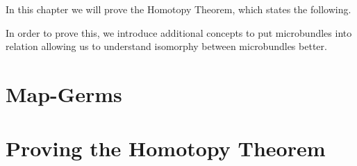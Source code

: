 \begin{myparagraph}
    In this chapter we will prove the Homotopy Theorem,
    which states the following.
\end{myparagraph}

\begin{myparagraph}
    In order to prove this, we introduce additional
    concepts to put microbundles into relation allowing us to
    understand isomorphy between microbundles better.
\end{myparagraph}
\section{Map-Germs}\label{section::germs}




\section{Proving the Homotopy Theorem}\label{section::homotopy_prove}






